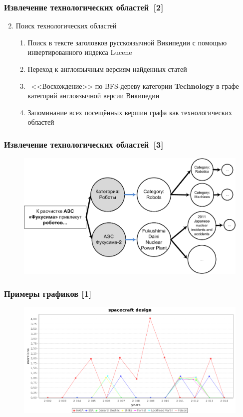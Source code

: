 \documentclass{beamer}
\begin{document}
\begin{frame}\frametitle{Извлечение технологических областей~[2]}
\begin{enumerate}
         \setcounter{enumi}{1}
        \item Поиск технологических областей
        \begin{enumerate} 
		\item Поиск в тексте заголовков русскоязычной Википедии с помощью инвертированного индекса Lucene
		\item Переход к англоязычным версиям найденных статей
		\item ~<<Восхождение>> по BFS-дереву категории \textbf{Technology} в графе категорий англоязычной версии Википедии
		 \item Запоминание всех посещённых вершин графа как технологических областей
        \end{enumerate}
\end{enumerate}
\end{frame}

\begin{frame}\frametitle{Извлечение технологических областей~[3]}

\begin{figure}[ht]
\begin{center}
\includegraphics[width=4.5in]{Process.png}
\end{center}
\end{figure}

\end{frame}

\begin{frame}\frametitle{Примеры графиков [1]}
\begin{figure}[ht]
\begin{center}
\includegraphics[width=4.5in]{space.png}
\end{center}
\end{figure}
\end{frame}
\end{document}
